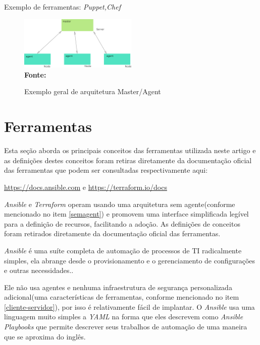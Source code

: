 Exemplo de ferramentas: \textit{Puppet,Chef} 

 \begin{figure}[ht]
	\centering	
	\caption[\hspace{0.1cm}Exemplo arquitetura Master/Agent]{Exemplo geral de arquitetura Master/Agent}
	\vspace{-0.4cm}
	\includegraphics[width=0.5\textwidth]{figuras/master-agent.png}
	 \vspace{-0.2cm}
	\\\textbf{\footnotesize Fonte: \cite{Harit}}
	\label{fig:figura4}
\end{figure}
\vspace{-0.5cm}

\section{Ferramentas}

Esta seção aborda os principais conceitos das ferramentas utilizada neste artigo e as definições destes conceitos foram retiras diretamente da documentação oficial das ferramentas que podem ser consultadas respectivamente aqui: 

\href{https://docs.ansible.com}{https://docs.ansible.com} e \href{https://terraform.io/docs}{https://terraform.io/docs}

\textit{Ansible} e \textit{Terraform} operam usando uma arquitetura sem agente(conforme mencionado no item \ref{semagent}) e promovem uma interface simplificada legível para a definição de recursos, facilitando a adoção. As definições de conceitos foram retirados diretamente da documentação oficial das ferramentas.



\textit{Ansible} é uma suíte completa de automação de processos de TI radicalmente simples, ela abrange desde o provisionamento e o gerenciamento de configurações e outras necessidades..

Ele não usa agentes e nenhuma infraestrutura de segurança personalizada adicional(uma características de ferramentas, conforme mencionado no item \ref{cliente-servidor}), por isso é relativamente fácil de implantar. O \textit{Ansible} usa uma linguagem muito simples a \textit{YAML} na forma que eles descrevem como \textit{Ansible Playbooks} que permite descrever seus trabalhos de automação de uma maneira que se aproxima do inglês. 

